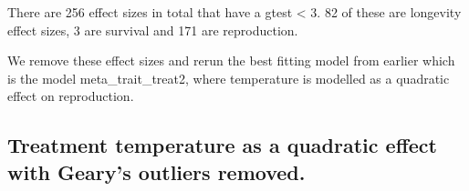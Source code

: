 \documentclass[
]{article}
\begin{document}
There are 256 effect sizes in total that have a gtest \textless{} 3. 82
of these are longevity effect sizes, 3 are survival and 171 are
reproduction.

We remove these effect sizes and rerun the best fitting model from
earlier which is the model meta\_trait\_treat2, where temperature is
modelled as a quadratic effect on reproduction.

\hypertarget{treatment-temperature-as-a-quadratic-effect-with-gearys-outliers-removed.}{%
\subsection{Treatment temperature as a quadratic effect with Geary's
outliers
removed.}\label{treatment-temperature-as-a-quadratic-effect-with-gearys-outliers-removed.}}
\end{document}
